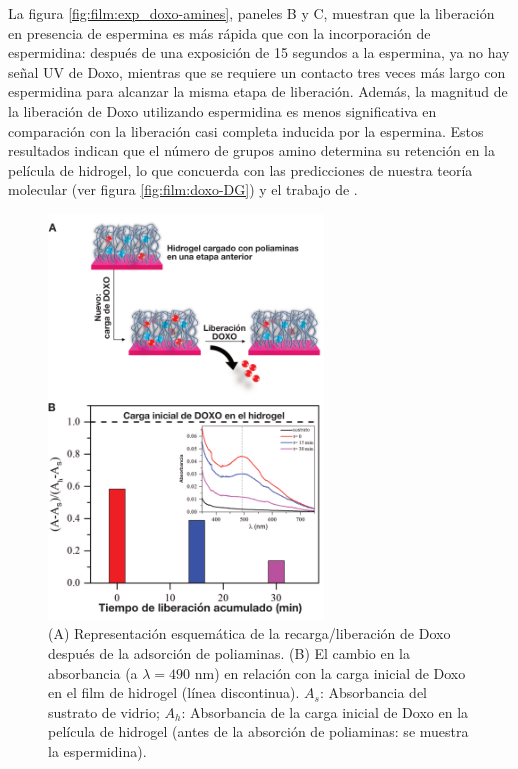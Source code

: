 La figura \ref{fig:film:exp_doxo-amines}, paneles  B y C, muestran que la liberaci\'on en presencia de espermina es m\'as r\'apida que con la incorporaci\'on de espermidina: despu\'es de una exposici\'on de 15 segundos a la espermina, ya no hay se\~nal UV de Doxo, mientras que se requiere un contacto tres veces m\'as largo con espermidina para alcanzar la misma etapa de liberaci\'on. Adem\'as, la magnitud de la liberaci\'on de Doxo utilizando espermidina es menos significativa en comparaci\'on con la liberaci\'on casi completa inducida por la espermina. Estos resultados indican que el n\'umero de grupos amino determina su retenci\'on en la pel\'icula de hidrogel, lo que concuerda con las predicciones de nuestra teor\'ia molecular (ver figura \ref{fig:film:doxo-DG}) y el trabajo de \citet{Schimka2017}.


\begin{figure}[!htb]
	\centering
	\includegraphics[width=0.65\textwidth]{Figures/graph-film/fig12.pdf}
	\caption{(A) Representaci\'on esquem\'atica de la recarga/liberaci\'on de Doxo despu\'es de la adsorci\'on de poliaminas. (B) El cambio en la absorbancia (a $\lambda=490$ nm) en relaci\'on con la carga inicial de Doxo en el film de hidrogel (l\'inea discontinua). $A_s$: Absorbancia del sustrato de vidrio; $A_h$: Absorbancia de la carga inicial de Doxo en la pel\'icula de hidrogel (antes de la absorci\'on de poliaminas: se muestra la espermidina).}
	\label{fig:film:exp_doxo-reload}
\end{figure}


